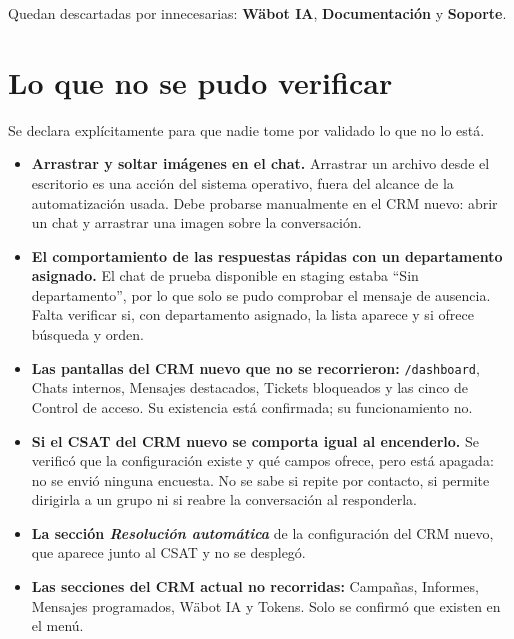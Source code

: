 \documentclass[11pt,a4paper]{article}
\newcommand{\cod}[1]{\texttt{\small #1}}
\begin{document}
Quedan descartadas por innecesarias: \textbf{Wäbot IA}, \textbf{Documentación} y
\textbf{Soporte}.

\section{Lo que no se pudo verificar}
\label{sec:limites}

Se declara explícitamente para que nadie tome por validado lo que no lo está.

\begin{itemize}
  \item \textbf{Arrastrar y soltar imágenes en el chat.} Arrastrar un archivo desde el
        escritorio es una acción del sistema operativo, fuera del alcance de la
        automatización usada. Debe probarse manualmente en el CRM nuevo: abrir un chat
        y arrastrar una imagen sobre la conversación.

  \item \textbf{El comportamiento de las respuestas rápidas con un departamento
        asignado.} El chat de prueba disponible en staging estaba ``Sin departamento'',
        por lo que solo se pudo comprobar el mensaje de ausencia. Falta verificar si,
        con departamento asignado, la lista aparece y si ofrece búsqueda y orden.

  \item \textbf{Las pantallas del CRM nuevo que no se recorrieron:} \cod{/dashboard},
        Chats internos, Mensajes destacados, Tickets bloqueados y las cinco de Control de
        acceso. Su existencia está confirmada; su funcionamiento no.

  \item \textbf{Si el CSAT del CRM nuevo se comporta igual al encenderlo.} Se verificó
        que la configuración existe y qué campos ofrece, pero está apagada: no se envió
        ninguna encuesta. No se sabe si repite por contacto, si permite dirigirla a un
        grupo ni si reabre la conversación al responderla.

  \item \textbf{La sección \emph{Resolución automática}} de la configuración del CRM
        nuevo, que aparece junto al CSAT y no se desplegó.

  \item \textbf{Las secciones del CRM actual no recorridas:} Campañas, Informes,
        Mensajes programados, Wäbot IA y Tokens. Solo se confirmó que existen en el
        menú.


\end{itemize}
\end{document}
